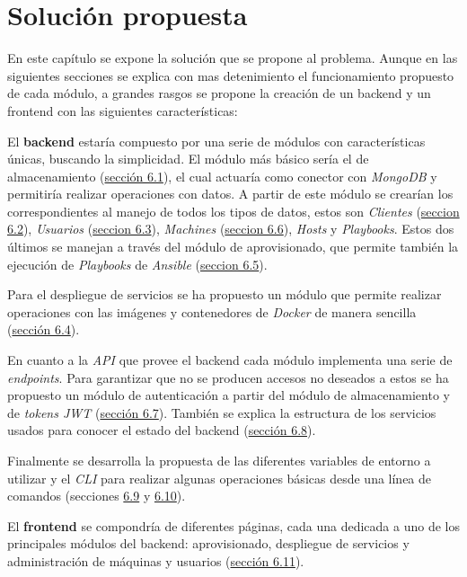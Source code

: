 \chapter{Solución propuesta}
\label{cap6}

En este capítulo se expone la solución que se propone al problema. Aunque en las siguientes secciones se explica con mas detenimiento el funcionamiento propuesto de cada módulo, a grandes rasgos se propone la creación de un backend y un frontend con las siguientes características:

\smallskip
El \textbf{backend} estaría compuesto por una serie de módulos con características únicas, buscando la simplicidad. El módulo más básico sería el de almacenamiento (\hyperref[sec:deploycap6]{sección 6.1}), el cual actuaría como conector con \textit{MongoDB} y permitiría realizar operaciones con datos. A partir de este módulo se crearían los correspondientes al manejo de todos los tipos de datos, estos son \textit{Clientes} (\hyperref[sec:clientcap6]{seccion 6.2}), \textit{Usuarios} (\hyperref[sec:usercap6]{seccion 6.3}), \textit{Machines} (\hyperref[sec:machinescap6]{seccion 6.6}), \textit{Hosts} y \textit{Playbooks}. Estos dos últimos se manejan a través del módulo de aprovisionado, que permite también la ejecución de \textit{Playbooks} de \textit{Ansible} (\hyperref[sec:provisioncap6]{seccion 6.5}).

Para el despliegue de servicios se ha propuesto un módulo que permite realizar operaciones con las imágenes y contenedores de \textit{Docker} de manera sencilla (\hyperref[sec:deploycap6]{sección 6.4}).

En cuanto a la \textit{API} que provee el backend cada módulo implementa una serie de \textit{endpoints}. Para garantizar que no se producen accesos no deseados a estos se ha propuesto un módulo de autenticación a partir del módulo de almacenamiento y de \textit{tokens JWT} (\hyperref[sec:authcap6]{sección 6.7}). También se explica la estructura de los servicios usados para conocer el estado del backend (\hyperref[sec:statuscap6]{sección 6.8}).

Finalmente se desarrolla la propuesta de las diferentes variables de entorno a utilizar y el \textit{CLI} para realizar algunas operaciones básicas desde una línea de comandos (secciones \hyperref[sec:variablescap6]{6.9} y \hyperref[sec:clicap6]{6.10}).

\smallskip
El \textbf{frontend} se compondría de diferentes páginas, cada una dedicada a uno de los principales módulos del backend: aprovisionado, despliegue de servicios y administración de máquinas y usuarios (\hyperref[sec:frontcap6]{sección 6.11}).


